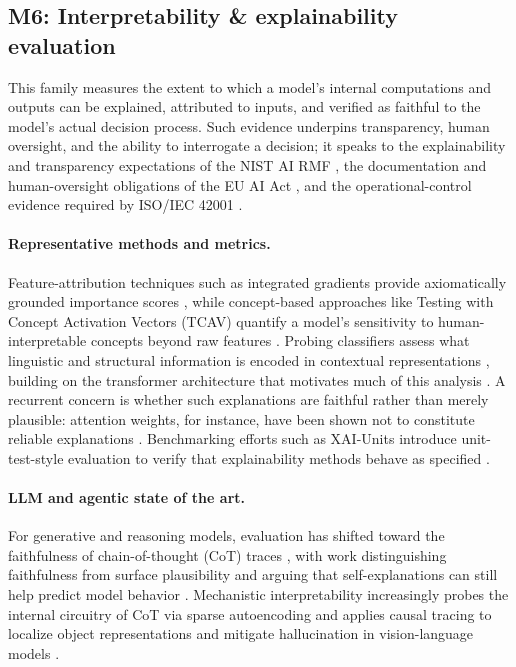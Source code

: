 \subsection{M6: Interpretability \& explainability evaluation}

This family measures the extent to which a model's internal computations and outputs can be explained, attributed to inputs, and verified as faithful to the model's actual decision process. Such evidence underpins transparency, human oversight, and the ability to interrogate a decision; it speaks to the explainability and transparency expectations of the NIST AI RMF \cite{nist2023airmf}, the documentation and human-oversight obligations of the EU AI Act \cite{euaiact2024}, and the operational-control evidence required by ISO/IEC 42001 \cite{iso42001}.

\paragraph{Representative methods and metrics.} Feature-attribution techniques such as integrated gradients provide axiomatically grounded importance scores \cite{sudre2024axiomatic_integrated_gradients}, while concept-based approaches like Testing with Concept Activation Vectors (TCAV) quantify a model's sensitivity to human-interpretable concepts beyond raw features \cite{kim2019tcav}. Probing classifiers assess what linguistic and structural information is encoded in contextual representations \cite{tenney2019edge_probing}, building on the transformer architecture that motivates much of this analysis \cite{vaswani2017transformer}. A recurrent concern is whether such explanations are faithful rather than merely plausible: attention weights, for instance, have been shown not to constitute reliable explanations \cite{jain2019attention_not_explanation}. Benchmarking efforts such as XAI-Units introduce unit-test-style evaluation to verify that explainability methods behave as specified \cite{yang2024xai_units}.

\paragraph{LLM and agentic state of the art.} For generative and reasoning models, evaluation has shifted toward the faithfulness of chain-of-thought (CoT) traces \cite{yang2023measuring_faithfulness_cot}, with work distinguishing faithfulness from surface plausibility \cite{turpin2024faithfulness_plausibility} and arguing that self-explanations can still help predict model behavior \cite{lanham2024positive_case_faithfulness}. Mechanistic interpretability increasingly probes the internal circuitry of CoT via sparse autoencoding \cite{zou2024cot_mechanistic} and applies causal tracing to localize object representations and mitigate hallucination in vision-language models \cite{zhang2024causal_tracing_vqa}.


